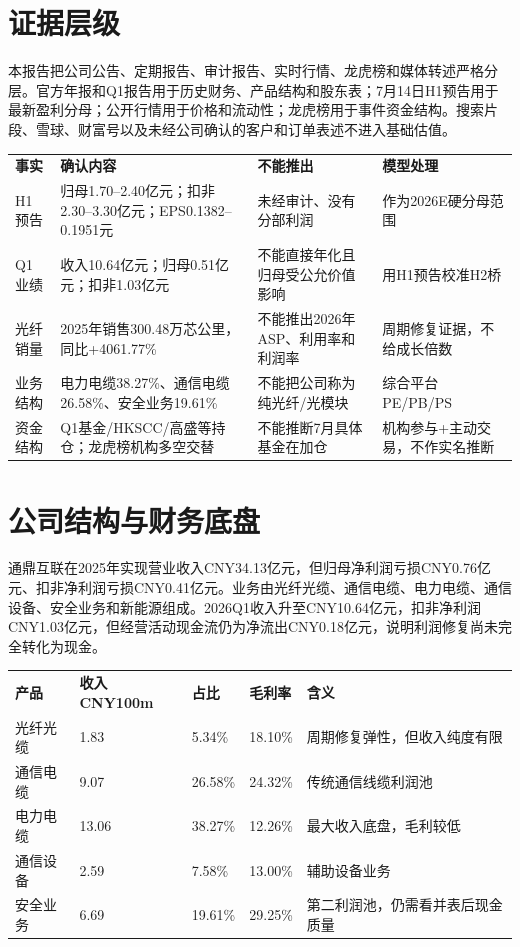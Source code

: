 \section{证据层级}
本报告把公司公告、定期报告、审计报告、实时行情、龙虎榜和媒体转述严格分层。官方年报和Q1报告用于历史财务、产品结构和股东表；7月14日H1预告用于最新盈利分母；公开行情用于价格和流动性；龙虎榜用于事件资金结构。搜索片段、雪球、财富号以及未经公司确认的客户和订单表述不进入基础估值。

\begin{exhibitbox}
\begin{tabularx}{\exhibitboxwidth}{L{3.0cm}X L{3.0cm}X}
\textbf{事实} & \textbf{确认内容} & \textbf{不能推出} & \textbf{模型处理} \\
H1预告 & 归母1.70--2.40亿元；扣非2.30--3.30亿元；EPS0.1382--0.1951元 & 未经审计、没有分部利润 & 作为2026E硬分母范围 \\
Q1业绩 & 收入10.64亿元；归母0.51亿元；扣非1.03亿元 & 不能直接年化且归母受公允价值影响 & 用H1预告校准H2桥 \\
光纤销量 & 2025年销售300.48万芯公里，同比+4061.77\% & 不能推出2026年ASP、利用率和利润率 & 周期修复证据，不给成长倍数 \\
业务结构 & 电力电缆38.27\%、通信电缆26.58\%、安全业务19.61\% & 不能把公司称为纯光纤/光模块 & 综合平台PE/PB/PS \\
资金结构 & Q1基金/HKSCC/高盛等持仓；龙虎榜机构多空交替 & 不能推断7月具体基金在加仓 & 机构参与+主动交易，不作实名推断 \\
\end{tabularx}
\end{exhibitbox}

\section{公司结构与财务底盘}
通鼎互联在2025年实现营业收入CNY34.13亿元，但归母净利润亏损CNY0.76亿元、扣非净利润亏损CNY0.41亿元。业务由光纤光缆、通信电缆、电力电缆、通信设备、安全业务和新能源组成。2026Q1收入升至CNY10.64亿元，扣非净利润CNY1.03亿元，但经营活动现金流仍为净流出CNY0.18亿元，说明利润修复尚未完全转化为现金。

\begin{exhibitbox}
\begin{tabularx}{\exhibitboxwidth}{L{3.2cm}R{2.2cm}R{1.8cm}R{2.0cm}X}
\textbf{产品} & \textbf{收入CNY100m} & \textbf{占比} & \textbf{毛利率} & \textbf{含义} \\
光纤光缆 & 1.83 & 5.34\% & 18.10\% & 周期修复弹性，但收入纯度有限 \\
通信电缆 & 9.07 & 26.58\% & 24.32\% & 传统通信线缆利润池 \\
电力电缆 & 13.06 & 38.27\% & 12.26\% & 最大收入底盘，毛利较低 \\
通信设备 & 2.59 & 7.58\% & 13.00\% & 辅助设备业务 \\
安全业务 & 6.69 & 19.61\% & 29.25\% & 第二利润池，仍需看并表后现金质量 \\
\end{tabularx}
\end{exhibitbox}

